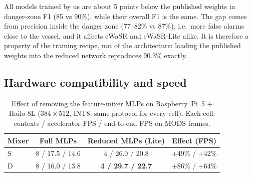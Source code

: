 \documentclass[conference]{IEEEtran}
\begin{document}
All models trained by us are about 5 points below the published weights in danger-zone F1 (85 vs 90\%), while their overall F1 is the same. The gap comes from precision inside the danger zone (77--82\% vs 87\%), i.e.\ more false alarms close to the vessel, and it affects eWaSR and eWaSR-Lite alike. It is therefore a property of the training recipe, not of the architecture: loading the published weights into the reduced network reproduces 90.3\% exactly.

\subsection{Hardware compatibility and speed}
\label{sec:hw}
\begin{table}[t]
\centering
\caption{Effect of removing the feature-mixer MLPs on Raspberry~Pi~5 + Hailo-8L ($384\times512$, INT8, same protocol for every cell). Each cell: contexts / accelerator FPS / end-to-end FPS on MODS frames.}
\label{tab:c1}
\setlength{\tabcolsep}{3pt}
\begin{tabular}{lccc}
\toprule
Mixer & Full MLPs & Reduced MLPs (Lite) & Effect (FPS) \\
\midrule
S & 8 / 17.5 / 14.6 & 4 / 26.0 / 20.8 & +49\% / +42\% \\
D & 8 / 16.0 / 13.8 & \textbf{4 / 29.7 / 22.7} & +86\% / +64\% \\
\bottomrule
\end{tabular}
\end{table}
\end{document}
